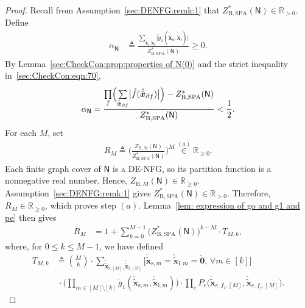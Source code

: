 \documentclass[journal]{IEEEtran}
\newcommand{\add}[1]{{\color{black}#1}}
\newcommand{\vect}[1]{ \bm{#1} }
\newcommand{\setpf}{ \partial f }
\newcommand{\graphN}{ \mathsf{N} }
\newcommand{\defeq}{ \triangleq }
\newcommand{\sRp}{ \mathbb{R}_{\geq 0} }
\newcommand{\sRpp}{ \mathbb{R}_{> 0} }
\newcommand{\ZBSPA}{ Z_{\mathrm{B,SPA}} }
\newcommand{\ZBM}{ Z_{\mathrm{B},M} }
\newcommand{\LCTtv}[1]{ \mathring{ \tilde{ \vect{#1} } } }
\newcommand{\LCT}[1]{ \mathring{#1} }
\newcommand{\efi}{ e,f_i }
\newcommand{\efj}{ e,f_j }
\newcommand{\LCTvxl}{ \LCTtv{x}_{\mathrm{l}} }
\newcommand{\LCTvxs}{ \LCTtv{x}_{\mathrm{s}} }
\newcommand{\LCTvxlm}{ \LCTtv{x}_{\mathrm{l},m} }
\newcommand{\LCTvxsm}{ \LCTtv{x}_{\mathrm{s},m} }
\newcommand{\LCTvxlM}{ \LCTtv{x}_{\mathrm{l},[M]} }
\newcommand{\LCTvxsM}{ \LCTtv{x}_{\mathrm{s},[M]} }
\newcommand{\gone}{\LCT{g}_{1}}
\newcommand{\tv}[1]{ \tilde{\vect{#1}} }
\begin{document}
\begin{appendices}
  \begin{proof}
    Recall from Assumption~\ref{sec:DENFG:remk:1} that $ \ZBSPA^{*}(\graphN) \in \sRpp $.
    Define
    \begin{align}
      \alpha_{\graphN}
       & \defeq
      \frac{
        \sum\limits_{ \LCTvxs, \LCTvxl }
        \bigl|\gone( \LCTvxs, \LCTvxl )\bigr|
      }{
        \ZBSPA^{*}(\graphN) } \geq 0.
      \label{sec:CheckCon:eqn:71}
    \end{align}
    By Lemma~\ref{sec:CheckCon:prop:properties of N(0)} and
    the strict inequality in~\eqref{sec:CheckCon:eqn:70},
    \begin{align}
      \alpha_{\graphN}
      =\frac{ \prod\limits_{f}
         \Bigl( \sum\limits_{\LCTtv{x}_{\setpf}}
         \bigl| \LCT{f}( \LCTtv{x}_{\setpf} ) \bigr| \Bigr)
         - \ZBSPA^{*}(\graphN)
       }{ \ZBSPA^{*}(\graphN) }
      < \frac{1}{2}.
      \label{sec:CheckCon:eqn:alpha-half}
    \end{align}
    For each $M$, set
    \begin{align}
      R_M
      \defeq
      \Biggl( \frac{ \ZBM(\graphN) }{ \ZBSPA^{*}(\graphN) } \Biggr)^{\!M} \overset{(a)}{\in} \sRp.
      \label{sec:CheckCon:eqn:R-def}
    \end{align}
    \add{Each finite graph cover of $\graphN$ is a DE-NFG, so its partition
      function is a nonnegative real number. Hence,
      $\ZBM(\graphN)\in\sRp$. Assumption~\ref{sec:DENFG:remk:1} gives
      $\ZBSPA^{*}(\graphN)\in\sRpp$. Therefore, $R_M\in\sRp$, which proves
      step $(a)$. Lemma~\ref{lem: expression of go and g1 and pe} then gives
      \begin{align}
        R_M
         & = 1
        +
        \sum_{k=0}^{M-1}
        \bigl( \ZBSPA^{*}(\graphN) \bigr)^{\! k-M}
        \cdot
        T_{M,k},
        \label{sec:CheckCon:eqn:R-expansion}
      \end{align}
      where, for $0 \leq k \leq M-1$, we have defined
      \begin{align*}
        T_{M,k}
         & \defeq
        \binom{M}{k}
        \cdot
        \sum_{ \LCTvxsM, \LCTvxlM }
        \bigl[ \LCTvxsm \! = \! \LCTvxlm \! = \! \tv{0},\, \forall m \in [k] \bigr]
        \\
         & \
        \cdot
        \Biggl(
        \prod_{ m \in [M] \setminus [k] }
        \gone( \LCTvxsm, \LCTvxlm )
        \Biggr)
        \! \cdot
        \prod_{e}
        P_{e}\bigl( \LCTtv{x}_{\efi,[M]}, \LCTtv{x}_{\efj,[M]} \bigr).
      \end{align*}
}
\end{proof}
\end{appendices}
\end{document}
